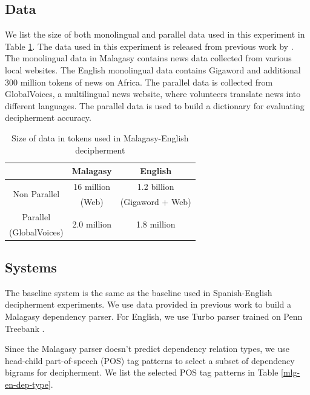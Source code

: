 \subsection{Data}
We list the size of both monolingual and parallel data used in this experiment in Table \ref{mlg-en-data}. The data used in this experiment is released from previous work by . The monolingual data in Malagasy contains news data collected from various local websites. The English monolingual data contains Gigaword and additional 300 million tokens of news on Africa. The parallel data is collected from GlobalVoices, a multilingual news website, where volunteers translate news into different languages. The parallel data is used to build a dictionary for evaluating decipherment accuracy. 

 \begin{table}
 \begin{center}
 \begin{tabular}{ |c|c|c| } \hline
             & Malagasy & English \\ \hline
\multirow{2}{*}{Non Parallel} & 16 million & 1.2 billion\\ 
& (Web) & (Gigaword + Web) \\ \hline
Parallel & \multirow{2}{*}{2.0 million} & \multirow{2}{*}{1.8 million} \\
(GlobalVoices) & &  \\ \hline
 \end{tabular}
 \caption{Size of data in tokens used in Malagasy-English decipherment}
 \label{mlg-en-data}
 \end{center}
 \end{table}
 
\subsection{Systems}
The baseline system is the same as the baseline used in Spanish-English decipherment experiments. We use data provided in previous work \cite{dou-vaswani-knight:2014:EMNLP2014} to build a Malagasy dependency parser. For English, we use Turbo parser trained on Penn Treebank \cite{TurboParser}.  

Since the Malagasy parser doesn't predict dependency relation types, we use head-child part-of-speech (POS) tag patterns to select a subset of dependency bigrams for decipherment. We list the selected POS tag patterns in Table \ref{mlg-en-dep-type}.

